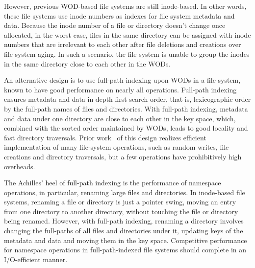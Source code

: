 However, previous WOD-based file systems are still inode-based.
In other words, these file systems use inode numbers as indexes for
file system metadata and data.
Because the inode number of a file or directory doesn't change once allocated,
in the worst case,
files in the same directory can be assigned with inode numbers that are
irrelevant to each other after file deletions and creations over file system
aging.
In such a scenario, the file system is unable to group the inodes in the
same directory close to each other in the WODs.

An alternative design is to use full-path indexing upon WODs in a file system,
known to have good performance on nearly all operations.
Full-path indexing ensures metadata and data in depth-first-search order,
that is, lexicographic order by the full-path names of files and directories.
With full-path indexing, metadata and data under one directory are close to each
other in the key space, which, combined with the sorted order maintained by
WODs, leads to good locality and fast directory traversals.
Prior work~\citep{betrfs1,betrfs1tos,betrfs2,betrfs2tos,betrfs3} of this design
realizes efficient implementation of many file-system operations, such as random
writes, file creations and directory traversals,
but a few operations have prohibitively high overheads.

The Achilles' heel of full-path indexing is the performance of namespace
operations, in particular, renaming large files and directories.
In inode-based file systems,
renaming a file or directory is just a pointer swing,
moving an entry from one directory to another directory,
without touching the file or directory being renamed.
However, with full-path indexing, renaming a directory involves changing the
full-paths of all files and directories under it,
updating keys of the metadata and data and moving them in the key space.
Competitive performance for namespace operations in full-path-indexed file
systems should complete in an I/O-efficient manner.

